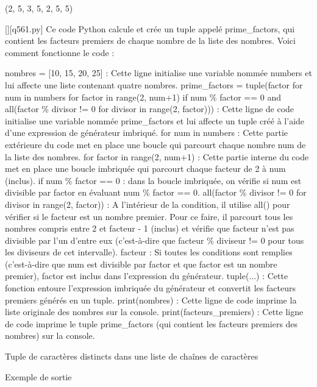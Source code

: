 (2, 5, 3, 5, 2, 5, 5)
        \par
        \begin{solution}
            \renewcommand{\nomfichier}{q561.py}
            \pythonfile{\chemincode \nomfichier}[][\nomfichier]
            Ce code Python calcule et crée un tuple appelé prime\_factors, qui contient les facteurs premiers de chaque nombre de la liste des nombres. Voici comment fonctionne le code :

    nombres = [10, 15, 20, 25] : Cette ligne initialise une variable nommée numbers et lui affecte une liste contenant quatre nombres.
    prime\_factors = tuple(factor for num in numbers for factor in range(2, num+1) if num \% factor == 0 and all(factor \% divisor != 0 for divisor in range(2, factor))) : Cette ligne de code initialise une variable nommée prime\_factors et lui affecte un tuple créé à l'aide d'une expression de générateur imbriqué.
        for num in numbers : Cette partie extérieure du code met en place une boucle qui parcourt chaque nombre num de la liste des nombres.
        for factor in range(2, num+1) : Cette partie interne du code met en place une boucle imbriquée qui parcourt chaque facteur de 2 à num (inclus).
        if num \% factor == 0 : dans la boucle imbriquée, on vérifie si num est divisible par factor en évaluant num \% factor == 0.
        all(factor \% divisor != 0 for divisor in range(2, factor)) : A l'intérieur de la condition, il utilise all() pour vérifier si le facteur est un nombre premier. Pour ce faire, il parcourt tous les nombres compris entre 2 et facteur - 1 (inclus) et vérifie que facteur n'est pas divisible par l'un d'entre eux (c'est-à-dire que facteur \% diviseur != 0 pour tous les diviseurs de cet intervalle).
        facteur : Si toutes les conditions sont remplies (c'est-à-dire que num est divisible par factor et que factor est un nombre premier), factor est inclus dans l'expression du générateur.
        tuple(...) : Cette fonction entoure l'expression imbriquée du générateur et convertit les facteurs premiers générés en un tuple.
    print(nombres) : Cette ligne de code imprime la liste originale des nombres sur la console.
    print(facteurs\_premiers) : Cette ligne de code imprime le tuple prime\_factors (qui contient les facteurs premiers des nombres) sur la console.
        \end{solution}
        

        \question
        Tuple de caractères distincts dans une liste de chaînes de caractères

Exemple de sortie

